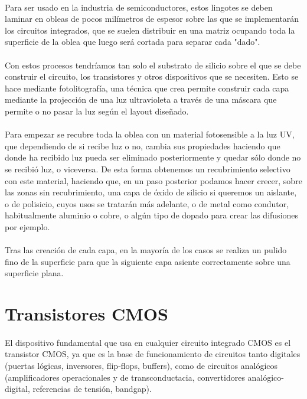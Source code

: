 \paragraph{}
Para ser usado en la industria de semiconductores, estos lingotes se deben laminar
en obleas de pocos milímetros de espesor sobre las que se implementarán los
circuitos integrados, que se suelen distribuir en una matriz ocupando toda la
superficie de la oblea que luego será cortada para separar cada "dado".

\paragraph{}
Con estos procesos tendríamos tan solo el substrato de silicio sobre el que
se debe construir el circuito, los transistores y otros dispositivos que se
necesiten. Esto se hace mediante fotolitografía, una técnica que crea permite
construir cada capa mediante la projección de una luz ultravioleta a través de
una máscara que permite o no pasar la luz según el layout diseñado.

\paragraph{}
Para empezar se recubre toda la oblea con un material fotosensible a la luz UV,
que dependiendo de si recibe luz o no, cambia sus propiedades haciendo que donde
ha recibido luz pueda ser eliminado posteriormente y quedar sólo donde no se recibió
luz, o viceversa. De esta forma obtenemos un recubrimiento selectivo con este
material, haciendo que, en un paso posterior podamos hacer crecer, sobre las zonas
sin recubrimiento, una capa de óxido de silicio si queremos un aislante, o de polisicio,
cuyos usos se tratarán más adelante, o de metal como condutor, habitualmente
aluminio o cobre, o algún tipo de dopado para crear las difusiones por ejemplo.

\paragraph{}
Tras las creación de cada capa, en la mayoría de los casos se realiza un pulido
fino de la superficie para que la siguiente capa asiente correctamente sobre una
superficie plana.

\section{Transistores CMOS}
\paragraph{}
El dispositivo fundamental que usa en cualquier circuito integrado CMOS es el
transistor CMOS, ya que es la base de funcionamiento de circuitos tanto digitales
(puertas lógicas, inversores, flip-flops, buffers), como de circuitos analógicos
(amplificadores operacionales y de transconductacia, convertidores analógico-digital,
referencias de tensión, bandgap).

